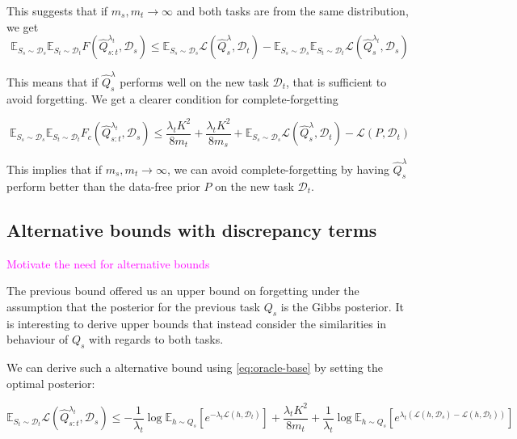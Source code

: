 \documentclass[letterpaper]{article}
\theoremstyle{definition}
\newcommand{\RM}[1]{{\textcolor{magenta}{#1}}}
\begin{document}
This suggests that if $m_s,m_t\rightarrow \infty$ and both tasks are from the same distribution, we get 
    \begin{equation*}
\mathbb{E}_{S_s\sim \mathcal{D}_s}\mathbb{E}_{S_t\sim \mathcal{D}_t}F(\hat{Q}^{\lambda_t}_{s:t},\mathcal{D}_s)\leq \mathbb{E}_{S_s\sim \mathcal{D}_s}\mathcal{L}(\hat{Q}^\lambda_s,\mathcal{D}_t)-\mathbb{E}_{S_s\sim \mathcal{D}_s}\mathbb{E}_{S_t\sim \mathcal{D}_t}\mathcal{L}(\hat{Q}^{\lambda_t}_{s},\mathcal{D}_s)
    \end{equation*}

This means that if $\hat{Q}^\lambda_s$ performs well on the new task $\mathcal{D}_t$, that is sufficient to avoid forgetting. 
We get a clearer condition for complete-forgetting

\begin{equation*}
\mathbb{E}_{S_s\sim \mathcal{D}_s}\mathbb{E}_{S_t\sim \mathcal{D}_t}F_c(\hat{Q}^{\lambda_t}_{s:t},\mathcal{D}_s)\leq \frac{\lambda_t K^2}{8m_t}+\frac{\lambda_t K^2}{8m_s}+\mathbb{E}_{S_s\sim \mathcal{D}_s}\mathcal{L}(\hat{Q}^\lambda_s,\mathcal{D}_t)-\mathcal{L}(P,\mathcal{D}_t)
    \end{equation*}

This implies that if $m_s,m_t\rightarrow \infty$, we can avoid complete-forgetting by having $\hat{Q}^\lambda_s$ perform better than the data-free prior $P$ on the new task $\mathcal{D}_t$.

\subsection{Alternative bounds with discrepancy terms}
\RM{Motivate the need for alternative bounds}

The previous bound offered us an upper bound on forgetting under the assumption that the posterior for the previous task $Q_s$ is the Gibbs posterior. It is interesting to derive upper bounds that instead consider the similarities in behaviour of $Q_s$ with regards to both tasks.

We can derive such a alternative bound using \eqref{eq:oracle-base} by setting the optimal posterior:

\begin{equation} 
\mathbb{E}_{S_t\sim \mathcal{D}_t}\mathcal{L}( \hat{Q}^{\lambda_t}_{s:t},\mathcal{D}_s)\leq -\frac{1}{\lambda_t}\log \mathbb{E}_{h\sim Q_s}\left [e^{-\lambda_t\mathcal{L}(h,\mathcal{D}_t)}\right ]+\frac{\lambda_t K^2}{8m_t}+\frac{1}{\lambda_t}\log\mathbb{E}_{h\sim Q_s}\left [e^{\lambda_t(\mathcal{L}(h,\mathcal{D}_s)-\mathcal{L}(h,\mathcal{D}_t))} \right ]
\end{equation}
\end{document}
